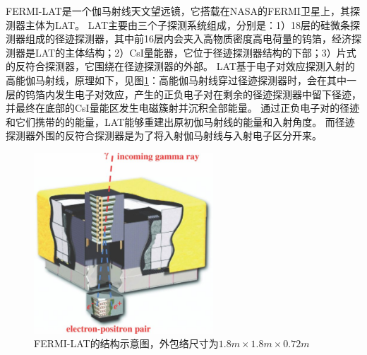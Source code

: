 FERMI-LAT是一个伽马射线天文望远镜，它搭载在NASA的FERMI卫星上，其探测器主体为LAT。
LAT主要由三个子探测系统组成，分别是：1）18层的硅微条探测器组成的径迹探测器，其中前16层内会夹入高物质密度高电荷量的钨箔，经济探测器是LAT的主体结构；2）CsI量能器，它位于径迹探测器结构的下部；3）片式的反符合探测器，它围绕在径迹探测器的外部。
LAT基于电子对效应探测入射的高能伽马射线，原理如下，见图\ref{fig:introduction:fermi_lat}：高能伽马射线穿过径迹探测器时，会在其中一层的钨箔内发生电子对效应，产生的正负电子对在剩余的径迹探测器中留下径迹，并最终在底部的CsI量能区发生电磁簇射并沉积全部能量。
通过正负电子对的径迹和它们携带的的能量，LAT能够重建出原初伽马射线的能量和入射角度。
而径迹探测器外围的反符合探测器是为了将入射伽马射线与入射电子区分开来。
\begin{figure}[htbp]
	\centering
	\includegraphics[width=0.6\textwidth]{chap/introduction/fig/fermi_lat.jpg}
	\caption{FERMI-LAT的结构示意图，外包络尺寸为$1.8m \times 1.8m \times 0.72m$}
	\label{fig:introduction:fermi_lat}
\end{figure}


